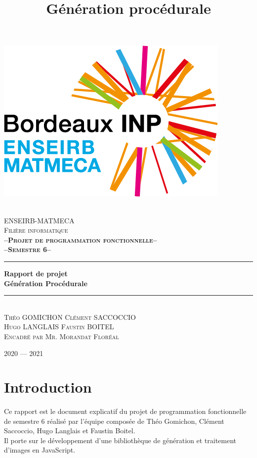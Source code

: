 \documentclass{article}
\title{Génération procédurale}
\author{}
\date{}
\newcommand{\HRule}{\rule{\linewidth}{0.5mm}}
\begin{document}
\begin{titlepage}
    \begin{center}
	    \includegraphics[scale=0.5]{logo.jpg}

        \textsc{\LARGE\\[0.5cm]ENSEIRB-MATMECA}
        \\[0.5cm]
        \textsc{\LARGE Filière informatique}
        \\[2cm]

        \textbf{\LARGE \textsc{--Projet de programmation fonctionnelle--}}
        \\
        \textbf{\LARGE \textsc{--Semestre 6--}}
        	
        \HRule
        { \huge \textbf{Rapport de projet\\Génération Procédurale}}
        \\[0.25cm]
        \HRule
        \\[1.5cm]
    
    	\textsc{\Large Théo GOMICHON\qquad}
    	\textsc{\Large Clément SACCOCCIO}\\[0.5cm]
    	\textsc{\Large Hugo LANGLAIS\qquad}
    	\textsc{\Large Faustin BOITEL}\\[0.5cm]
    	\textsc{\large Encadré par Mr. Morandat Floréal}
        \vfill
       
        {\large \textsc{2020 — 2021}}
    \end{center}
\end{titlepage}

\section*{Introduction}
\paragraph{}
Ce rapport est le document explicatif du projet de programmation fonctionnelle de semestre 6 réalisé par l'équipe composée de Théo Gomichon, Clément Saccoccio, Hugo Langlais et Faustin Boitel. \\
Il porte sur le développement d'une bibliothèque de génération et traitement d'images en \textsf{JavaScript}.
\end{document}
